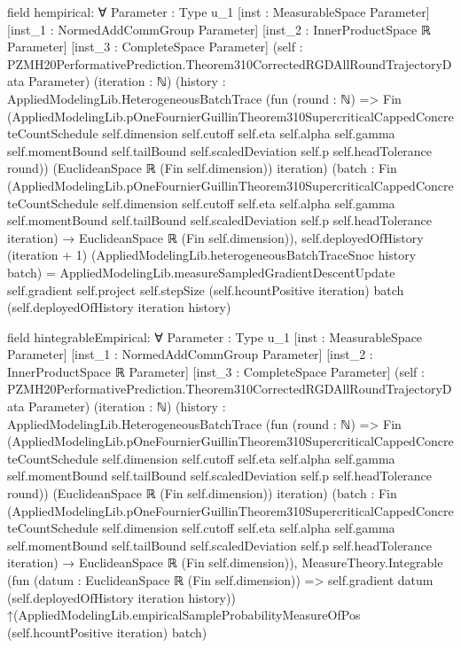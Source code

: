 \documentclass[10pt]{article}
\begin{document}
\begin{ReviewVerbatim}
field hempirical:
∀ {Parameter : Type u_1} [inst : MeasurableSpace Parameter] [inst_1 : NormedAddCommGroup Parameter]
  [inst_2 : InnerProductSpace ℝ Parameter] [inst_3 : CompleteSpace Parameter]
  (self : PZMH20PerformativePrediction.Theorem310CorrectedRGDAllRoundTrajectoryData Parameter) (iteration : ℕ)
  (history :
    AppliedModelingLib.HeterogeneousBatchTrace
      (fun (round : ℕ) =>
        Fin
          (AppliedModelingLib.pOneFournierGuillinTheorem310SupercriticalCappedConcreteCountSchedule self.dimension
            self.cutoff self.eta self.alpha self.gamma self.momentBound self.tailBound self.scaledDeviation self.p
            self.headTolerance round))
      (EuclideanSpace ℝ (Fin self.dimension)) iteration)
  (batch :
    Fin
        (AppliedModelingLib.pOneFournierGuillinTheorem310SupercriticalCappedConcreteCountSchedule self.dimension
          self.cutoff self.eta self.alpha self.gamma self.momentBound self.tailBound self.scaledDeviation self.p
          self.headTolerance iteration) →
      EuclideanSpace ℝ (Fin self.dimension)),
  self.deployedOfHistory (iteration + 1) (AppliedModelingLib.heterogeneousBatchTraceSnoc history batch) =
    AppliedModelingLib.measureSampledGradientDescentUpdate self.gradient self.project self.stepSize
      (self.hcountPositive iteration) batch (self.deployedOfHistory iteration history)

field hintegrableEmpirical:
∀ {Parameter : Type u_1} [inst : MeasurableSpace Parameter] [inst_1 : NormedAddCommGroup Parameter]
  [inst_2 : InnerProductSpace ℝ Parameter] [inst_3 : CompleteSpace Parameter]
  (self : PZMH20PerformativePrediction.Theorem310CorrectedRGDAllRoundTrajectoryData Parameter) (iteration : ℕ)
  (history :
    AppliedModelingLib.HeterogeneousBatchTrace
      (fun (round : ℕ) =>
        Fin
          (AppliedModelingLib.pOneFournierGuillinTheorem310SupercriticalCappedConcreteCountSchedule self.dimension
            self.cutoff self.eta self.alpha self.gamma self.momentBound self.tailBound self.scaledDeviation self.p
            self.headTolerance round))
      (EuclideanSpace ℝ (Fin self.dimension)) iteration)
  (batch :
    Fin
        (AppliedModelingLib.pOneFournierGuillinTheorem310SupercriticalCappedConcreteCountSchedule self.dimension
          self.cutoff self.eta self.alpha self.gamma self.momentBound self.tailBound self.scaledDeviation self.p
          self.headTolerance iteration) →
      EuclideanSpace ℝ (Fin self.dimension)),
  MeasureTheory.Integrable
    (fun (datum : EuclideanSpace ℝ (Fin self.dimension)) =>
      self.gradient datum (self.deployedOfHistory iteration history))
    ↑(AppliedModelingLib.empiricalSampleProbabilityMeasureOfPos (self.hcountPositive iteration) batch)


\end{ReviewVerbatim}
\end{document}
